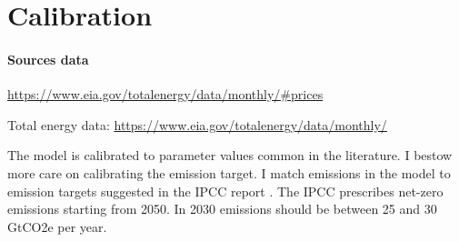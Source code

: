 \section{Calibration}\label{sec:calib}
\paragraph{Sources data}
\url{https://www.eia.gov/totalenergy/data/monthly/#prices}

Total energy data: \url{https://www.eia.gov/totalenergy/data/monthly/}


The model is calibrated to parameter values common in the literature. I bestow more care on  calibrating the emission target. 
I match emissions in the model to emission targets suggested in the IPCC report \citep{Rogelj2018MitigationDevelopment.}. 
The IPCC prescribes net-zero emissions starting from 2050. In 2030 emissions should be between 25 and 30 GtCO2e per year.


